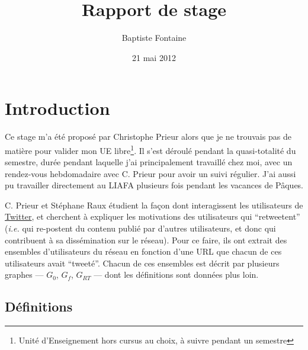 \documentclass[]{article}
\title{Rapport de stage}
\author{Baptiste Fontaine}
\date{21 mai 2012}
\begin{document}
\maketitle
\tableofcontents
\newpage
\section{Introduction}

Ce stage m'a été proposé par Christophe Prieur alors que je ne trouvais
pas de matière pour valider mon UE libre\footnote{Unité d'Enseignement
 hors cursus au choix, à suivre pendant un semestre}. Il s'est déroulé
pendant la quasi-totalité du semestre, durée pendant laquelle j'ai
principalement travaillé chez moi, avec un rendez-vous hebdomadaire avec
C. Prieur pour avoir un suivi régulier. J'ai aussi pu travailler
directement au LIAFA plusieurs fois pendant les vacances de Pâques.

C. Prieur et Stéphane Raux étudient la façon dont interagissent les
utilisateurs de \href{https://twitter.com/}{Twitter}, et cherchent à 
expliquer les motivations des utilisateurs qui ``retweetent''
(\emph{i.e.} qui re-postent du contenu publié par d'autres utilisateurs,
et donc qui contribuent à sa dissémination sur le réseau). Pour ce
faire, ils ont extrait des ensembles d'utilisateurs du réseau en
fonction d'une URL que chacun de ces utilisateurs avait ``tweeté''.
Chacun de ces ensembles est décrit par plusieurs graphes --- $G_{0}$, $G_{f}$,
$G_{RT}$ --- dont les définitions sont données plus loin.

\subsection{Définitions}
\end{document}
